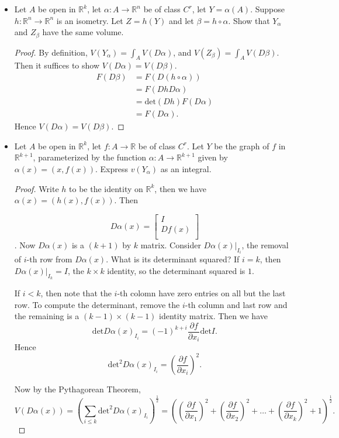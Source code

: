 \begin{itemize}
\item [22.1] Let $A$ be open in $\mathbb{R}^k$, let $\alpha: A \to \mathbb{R}^n$ be of class $C^r$, let $Y = \alpha(A)$. Suppose $h: \mathbb{R}^n \to \mathbb{R}^n$ is an isometry. Let $Z = h(Y)$ and let $\beta = h \circ \alpha$. Show that $Y_\alpha$ and $Z_\beta$ have the same volume.
\begin{proof}
	By definition, $V(Y_\alpha) = \int_A V(D\alpha)$, and $V(Z_\beta) = \int _A V(D \beta)$. Then it suffices to show $V(D \alpha) = V(D \beta)$.
	 \begin{align*}
		F(D \beta)
		&=  F(D(h \circ \alpha))\\
		&= F(Dh D\alpha) \\
		&= \text{det}(Dh) F(D \alpha)\\
		&= F(D \alpha)
	.\end{align*}
	Hence $V(D \alpha) = V(D \beta)$.
\end{proof}
\item [22.2] Let $A$ be open in $\mathbb{R}^k$, let $f: A \to \mathbb{R}$ be of class $C^r$. Let $Y$ be the graph of $f$ in $\mathbb{R}^{k+1}$, parameterized by the function $\alpha: A \to \mathbb{R}^{k+1}$ given by $\alpha(x) = (x, f(x))$. Express $v(Y_\alpha)$ as an integral.
\begin{proof}
	Write $h$ to be the identity on $\mathbb{R}^k$, then we have $\alpha(x) = (h(x), f(x))$. Then
	
	\[
		D \alpha (x) =
		\begin{bmatrix}
			I \\
			Df(x) \\
		\end{bmatrix}
	\]
	.
	Now $D\alpha(x)$ is a $(k+1)$ by $k$ matrix. Consider $D\alpha(x)|_{I_i}$, the removal of $i$-th row from $D\alpha(x)$. What is its determinant squared? If $i =k$, then $D\alpha(x)|_{I_k} = I$, the $k \times k$ identity, so the determinant squared is $1$.

	If $i < k$, then note that the $i$-th colomn have zero entries on all but the last row. To compute the determinant, remove the $i$-th column and last row and the remaining is a $(k-1) \times (k-1)$ identity matrix. Then we have
	\[
		\text{det} D\alpha(x)_{I_i} = (-1)^{k + i} \frac{\partial f}{\partial x_i} \text{det}I
	.\] 
	Hence
	\[
		\text{det}^2 D\alpha(x)_{I_i} = \left( \frac{\partial f}{\partial x_i} \right) ^2
	.\] 
		
	Now by the Pythagorean Theorem,
	\[
		V(D \alpha(x)) = \left( \sum_{i \le k} \text{det}^2 D\alpha(x)_{I_i} \right) ^{\frac{1}{2}} = \left(\left( \frac{\partial f}{\partial x_1} \right)^2  + \left( \frac{\partial f}{\partial x_2}  \right) ^2 + \ldots + \left( \frac{\partial f}{\partial x_{k}}  \right)^2 + 1 \right) ^{\frac{1}{2}}
	.\] 


\end{proof}
\end{itemize}
